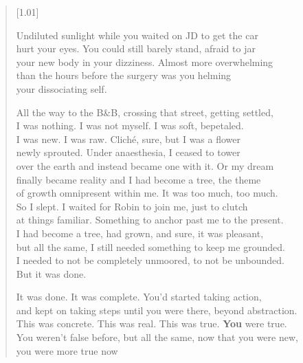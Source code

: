 \begin{verse}[1.01\textwidth]
  \begin{ally}
    \noindent Undiluted sunlight while you waited on JD to get the car\\
  \noindent hurt your eyes. You could still barely stand, afraid to jar\\
  \noindent your new body in your dizziness. Almost more overwhelming\\
  \noindent than the hours before the surgery was you helming\\
  \noindent your dissociating self.
\end{ally}

  All the way to the B\&B, crossing that street, getting settled,\\
  I was nothing. I was not myself. I was soft, bepetaled.\\
  I was new. I was raw. Cliché, sure, but I was a flower\\
  newly sprouted. Under anaesthesia, I ceased to tower\\
  over the earth and instead became one with it. Or my dream\\
  finally became reality and I had become a tree, the theme\\
  of growth omnipresent within me. It was too much, too much.\\
  So I slept. I waited for Robin to join me, just to clutch\\
  at things familiar. Something to anchor past me to the present.\\
  I had become a tree, had grown, and sure, it was pleasant,\\
  but all the same, I still needed something to keep me grounded.\\
  I needed to not be completely unmoored, to not be unbounded.\\
  But it was done.

  \begin{ally}
    \noindent It was done. It was complete. You'd started taking action,\\
  \noindent and kept on taking steps until you were there, beyond abstraction.\\
  \noindent This was concrete. This was real. This was true. \textbf{You} were true.\\
  \noindent You weren't false before, but all the same, now that you were new,\\
  \noindent you were more true now
\end{ally}
\end{verse}
\newpage

